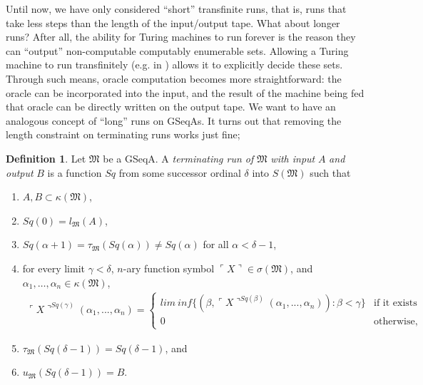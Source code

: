 \documentclass[12pt, twoside]{memoir}
\numberwithin{equation}{section}
\theoremstyle{definition}
\newtheorem{defi}[thm]{Definition}
\theoremstyle{remark}
\theoremstyle{definition}
\theoremstyle{definition}
\theoremstyle{definition}
\theoremstyle{remark}
\begin{document}
Until now, we have only considered ``short'' transfinite runs, that is, runs that take less steps than the length of the input/output tape. What about longer runs? After all, the ability for Turing machines to run forever is the reason they can ``output'' non-computable computably enumerable sets. Allowing a Turing machine to run transfinitely (e.g. in \cite{ittm}) allows it to explicitly decide these sets. Through such means, oracle computation becomes more straightforward: the oracle can be incorporated into the input, and the result of the machine being fed that oracle can be directly written on the output tape. We want to have an analogous concept of ``long'' runs on GSeqAs. It turns out that removing the length constraint on terminating runs works just fine; 

\begin{defi}\label{def242}
Let $\mathfrak{M}$ be a GSeqA. A \emph{terminating run of} $\mathfrak{M}$ \emph{with input} $A$ \emph{and output} $B$ is a function $Sq$ from some successor ordinal $\delta$ into $S(\mathfrak{M})$ such that 
\begin{enumerate}[label=(\alph*)]
    \item $A, B \subset \kappa(\mathfrak{M})$,
    \item $Sq(0) = l_{\mathfrak{M}}(A)$,
    \item $Sq(\alpha + 1) = \tau_{\mathfrak{M}}(Sq(\alpha)) \neq Sq(\alpha)$ for all $\alpha < \delta - 1$,
    \item for every limit $\gamma < \delta$, $n$-ary function symbol $\ulcorner X \urcorner \in \sigma(\mathfrak{M})$, and $\alpha_1, \dots, \alpha_n \in \kappa(\mathfrak{M})$,
    \begin{gather*}
        \ulcorner X \urcorner^{Sq(\gamma)} (\alpha_1, ..., \alpha_n) \! = \! 
        \begin{cases}
            lim \ inf \{(\beta, \ulcorner X \urcorner^{Sq(\beta)}(\alpha_1, ..., \alpha_n)) \! : \! \beta < \gamma\} & \!\!\!\! \text{if it exists} \\
            0 & \!\!\!\! \text{otherwise,}
        \end{cases} 
    \end{gather*}
    \item $\tau_{\mathfrak{M}}(Sq(\delta - 1)) = Sq(\delta - 1)$, and
    \item $u_{\mathfrak{M}}(Sq(\delta - 1)) = B$.
\end{enumerate}
\end{defi}
\end{document}
